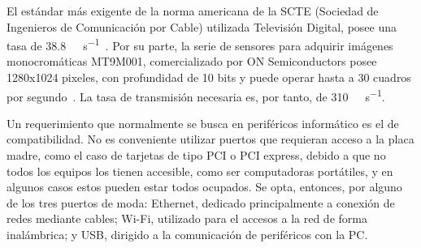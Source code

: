 


El estándar más exigente de la norma americana de la SCTE (Sociedad de Ingenieros de Comunicación por Cable) utilizada Televisión Digital, posee una tasa de \SI{38.8}{\mega\bit\per\second}~\cite{SocietyofCableTelecommuniocationsEngineers2006}. Por su parte, la serie de sensores para adquirir imágenes monocromáticas MT9M001, comercializado por ON Semiconductors posee 1280x1024 pixeles, con profundidad de 10 bits y puede operar hasta a 30 cuadros por segundo~\cite{MicronTechnology2004}. La tasa de transmisión necesaria es, por tanto, de \SI{310}{\mega\bit\per\second}.%

Un requerimiento que normalmente se busca en periféricos informático es el de compatibilidad. No es conveniente utilizar puertos que requieran acceso a la placa madre, como el caso de tarjetas de tipo PCI o PCI express, debido a que no todos los equipos los tienen accesible, como ser computadoras portátiles, y en algunos casos estos pueden estar todos ocupados. Se opta, entonces, por alguno de los tres puertos de moda: Ethernet, dedicado principalmente a conexión de redes mediante cables; Wi-Fi, utilizado para el accesos a la red de forma inalámbrica; y USB, dirigido a la comunicación de periféricos con la PC.%


